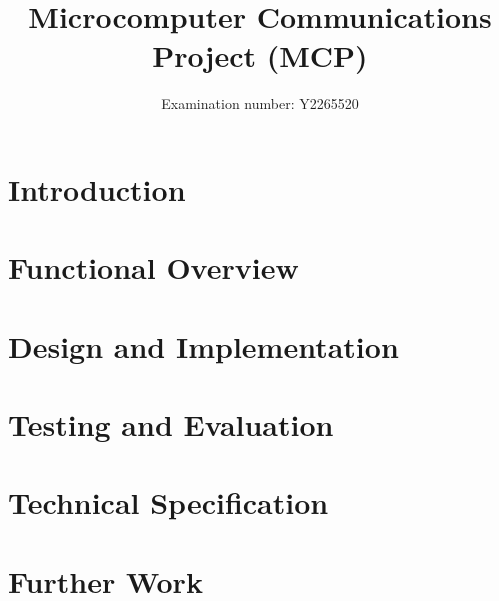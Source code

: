 \documentclass[a4paper,10pt]{article}
\title{Microcomputer Communications Project (MCP)}
\author{Examination number: Y2265520}
\begin{document}
\maketitle
\pagebreak
\tableofcontents
\pagebreak


\section{Introduction}

\section{Functional Overview}

\section{Design and Implementation}

\section{Testing and Evaluation}

\section{Technical Specification}

\section{Further Work}


\appendix

\pagebreak
\begin{thebibliography}{99}
\end{thebibliography}
\end{document}
